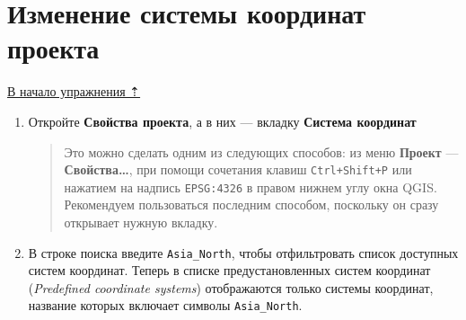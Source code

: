 \documentclass[
  12pt,
]{book}
\begin{document}
\hypertarget{map-design-population-change-crs}{%
\section{Изменение системы координат проекта}\label{map-design-population-change-crs}}

\protect\hyperlink{map-design-population}{В начало упражнения ⇡}

\begin{enumerate}
\def\labelenumi{\arabic{enumi}.}
\item
  Откройте \textbf{Свойства проекта}, а в них --- вкладку \textbf{Система координат}

  \begin{quote}
  Это можно сделать одним из следующих способов: из меню \textbf{Проект} --- \textbf{Свойства\ldots{}}, при помощи сочетания клавиш \texttt{Ctrl+Shift+P} или нажатием на надпись \texttt{EPSG:4326} в правом нижнем углу окна QGIS. Рекомендуем пользоваться последним способом, поскольку он сразу открывает нужную вкладку.
  \end{quote}
\item
  В строке поиска введите \texttt{Asia\_North}, чтобы отфильтровать список доступных систем координат. Теперь в списке предустановленных систем координат (\emph{Predefined coordinate systems}) отображаются только системы координат, название которых включает символы \texttt{Asia\_North}.


\end{enumerate}
\end{document}
